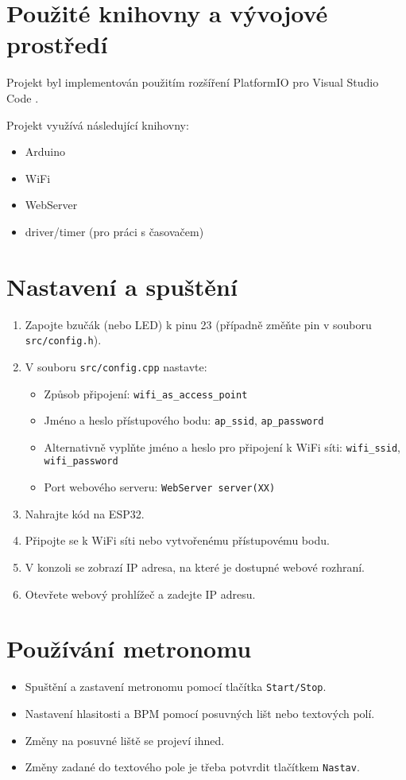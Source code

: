 \documentclass[a4paper, 11pt]{article}
\begin{document}
\section{Použité knihovny a vývojové prostředí}
Projekt byl implementován použitím rozšíření PlatformIO pro Visual Studio Code \cite{platformio_board}.

Projekt využívá následující knihovny:
\begin{itemize}
    \item Arduino
    \item WiFi
    \item WebServer
    \item driver/timer (pro práci s časovačem)
\end{itemize}

\section{Nastavení a spuštění}
\begin{enumerate}
    \item Zapojte bzučák (nebo LED) k pinu 23 (případně změňte pin v souboru \texttt{src/config.h}).
    \item V souboru \texttt{src/config.cpp} nastavte:
    \begin{itemize}
        \item Způsob připojení: \texttt{wifi\_as\_access\_point}
        \item Jméno a heslo přístupového bodu: \texttt{ap\_ssid}, \texttt{ap\_password}
        \item Alternativně vyplňte jméno a heslo pro připojení k WiFi síti: \texttt{wifi\_ssid}, \texttt{wifi\_password}
        \item Port webového serveru: \texttt{WebServer server(XX)}
    \end{itemize}
    \item Nahrajte kód na ESP32.
    \item Připojte se k WiFi síti nebo vytvořenému přístupovému bodu.
    \item V konzoli se zobrazí IP adresa, na které je dostupné webové rozhraní.
    \item Otevřete webový prohlížeč a zadejte IP adresu.
\end{enumerate}

\section{Používání metronomu}
\begin{itemize}
    \item Spuštění a zastavení metronomu pomocí tlačítka \texttt{Start/Stop}.
    \item Nastavení hlasitosti a BPM pomocí posuvných lišt nebo textových polí.
    \item Změny na posuvné liště se projeví ihned.
    \item Změny zadané do textového pole je třeba potvrdit tlačítkem \texttt{Nastav}.
\end{itemize}
\end{document}

